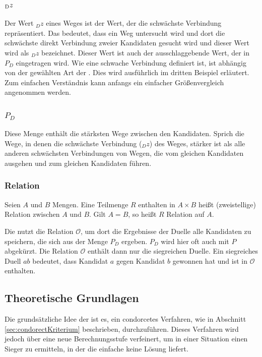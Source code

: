 \subsubsection{$\textsubscript{D}z$}
\label{dz}
Der Wert $_{D}z$ eines Weges ist der Wert, der die schwächste Verbindung repräsentiert. Das bedeutet, dass ein Weg untersucht wird und dort die schwächste direkt Verbindung zweier Kandidaten gesucht wird und dieser Wert wird als $_{D}z$ bezeichnet. Dieser Wert ist auch der ausschlaggebende Wert, der in  $P_{D}$ eingetragen wird. Wie eine schwache Verbindung definiert ist, ist abhängig von der gewählten Art der \schulze. Dies wird ausführlich im dritten Beispiel erläutert. Zum einfachen Verständnis kann anfangs ein einfacher Größenvergleich angenommen werden.

\subsubsection{$P_{D}$}
\label{PD}
Diese Menge enthält die stärksten Wege zwischen den Kandidaten. Sprich die Wege, in denen die schwächste Verbindung ($_{D}z$) des Weges, stärker ist als alle anderen schwächsten Verbindungen von Wegen, die vom gleichen Kandidaten ausgehen und zum gleichen Kandidaten führen.

\subsubsection{Relation}
\label{relation}
\glqq Seien $A$ und $B$ Mengen. Eine Teilmenge $R$ enthalten in $A \times B$ heißt (zweistellige) Relation zwischen $A$ und $B$. Gilt $A = B$, so heißt $R$ Relation auf $A$.\grqq{} \citet{Lang2018}

Die \schulze nutzt die Relation $\mathcal{O}$, um dort die Ergebnisse der Duelle alle Kandidaten zu speichern, die sich aus der Menge $P_{D}$ ergeben. $P_{D}$ wird hier oft auch mit $P$ abgekürzt. Die  Relation $\mathcal{O}$ enthält dann nur die siegreichen Duelle. Ein siegreiches Duell $ab$ bedeutet, dass Kandidat $a$ gegen Kandidat $b$ gewonnen hat und ist in $\mathcal{O}$ enthalten.

\newpage
\subsection{Theoretische Grundlagen} 
\label{sec:theoretische Grundlagen}

Die grundsätzliche Idee der \schulze ist es, ein condorcetes Verfahren, wie in Abschnitt \ref{sec:condorectKriterium} beschrieben, durchzuführen. Dieses Verfahren wird jedoch über eine neue Berechnungsstufe verfeinert, um in einer Situation einen Sieger zu ermitteln, in der die einfache \condorcetMethode keine Lösung liefert.

